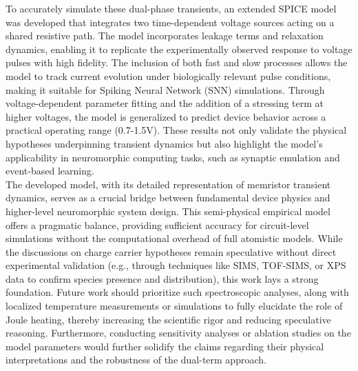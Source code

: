 

\noindent To accurately simulate these dual-phase transients, an extended SPICE model was developed that integrates two time-dependent voltage sources acting on a shared resistive path. The model incorporates leakage terms and relaxation dynamics, enabling it to replicate the experimentally observed response to voltage pulses with high fidelity. The inclusion of both fast and slow processes allows the model to track current evolution under biologically relevant pulse conditions, making it suitable for Spiking Neural Network (SNN) simulations. Through voltage-dependent parameter fitting and the addition of a stressing term at higher voltages, the model is generalized to predict device behavior across a practical operating range (0.7-1.5V). These results not only validate the physical hypotheses underpinning transient dynamics but also highlight the model's applicability in neuromorphic computing tasks, such as synaptic emulation and event-based learning.\\

\noindent The developed model, with its detailed representation of memristor transient dynamics, serves as a crucial bridge between fundamental device physics and higher-level neuromorphic system design. This semi-physical empirical model offers a pragmatic balance, providing sufficient accuracy for circuit-level simulations without the computational overhead of full atomistic models. While the discussions on charge carrier hypotheses remain speculative without direct experimental validation (e.g., through techniques like SIMS, TOF-SIMS, or XPS data to confirm species presence and distribution), this work lays a strong foundation. Future work should prioritize such spectroscopic analyses, along with localized temperature measurements or simulations to fully elucidate the role of Joule heating, thereby increasing the scientific rigor and reducing speculative reasoning. Furthermore, conducting sensitivity analyses or ablation studies on the model parameters would further solidify the claims regarding their physical interpretations and the robustness of the dual-term approach.\\

